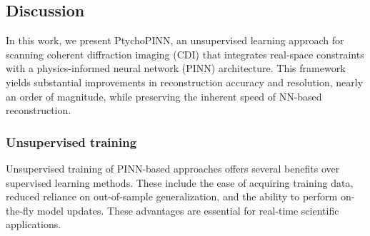 \documentclass[sn-mathphys]{sn-jnl}%
\theoremstyle{thmstyleone}%
\theoremstyle{thmstyletwo}%
\theoremstyle{thmstylethree}%
\begin{document}
%
%
%

\subsection{Discussion}
In this work, we present PtychoPINN, an unsupervised learning approach for scanning coherent diffraction imaging (CDI) that integrates real-space constraints with a physics-informed neural network (PINN) architecture. This framework yields substantial improvements in reconstruction accuracy and resolution, nearly an order of magnitude, while preserving the inherent speed of NN-based reconstruction.

\subsubsection{Unsupervised training}
Unsupervised training of PINN-based approaches offers several benefits over supervised learning methods. These include the ease of acquiring training data, reduced reliance on out-of-sample generalization, and the ability to perform on-the-fly model updates. These advantages are essential for real-time scientific applications.
\end{document}
